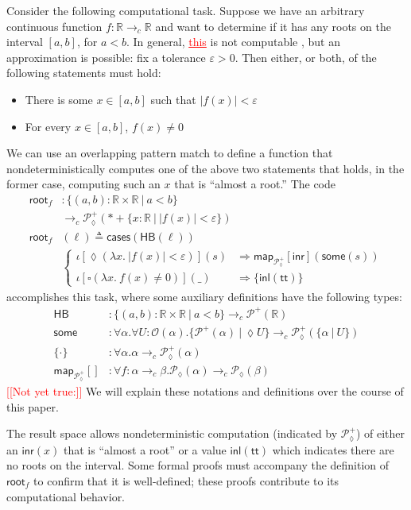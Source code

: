 \documentclass[conference]{IEEEtran}
\newcommand{\PLower}{\mathcal{P}_\lozenge}
\newcommand{\Viet}{\mathcal{P}}
\newcommand{\cto}{\to_c}
\newcommand{\R}{\mathbb{R}}
\newcommand{\map}[2]{\mathsf{map}_{#1}[{#2}]}
\newcommand{\fun}[2]{\lambda {#1}.\  {#2}}
\newcommand{\suchthat}{\ |\ }
\newcommand{\One}{\ast}
\newcommand{\Open}[1]{\mathcal{O}({#1})}
\newcommand{\wildcard}{\_}
\newcommand{\oinclf}[1]{\iota[{#1}]}
\newcommand{\oincl}[2]{\oinclf{#1} \left({#2}\right)}
\newcommand{\Branch}{\Rightarrow}
\newcommand{\note}[1]{\textcolor{red}{[[{#1}]]}}
\newcommand{\grammar}[1]{\textcolor{red}{\underline{#1}}}
\begin{document}
Consider the following computational task. Suppose we have an arbitrary continuous function $f : \R \cto \R$ and want to determine if it has any roots on the interval $[a,b]$, for $a < b$. In general, \grammar{this} is not computable \cite{lamcra}, but an approximation is possible: fix a tolerance $\varepsilon > 0$. Then either, or both, of the following statements must hold:
\begin{itemize}
\item There is some $x \in [a, b]$ such that $|f(x)| < \varepsilon$
\item For every $x \in [a, b]$, $f(x) \neq 0$
\end{itemize}
We can use an overlapping pattern match to define a function that nondeterministically computes one of the above two statements that holds, in the former case, computing such an $x$ that is ``almost a root.'' The code
\begin{align*}
\mathsf{root}_f &: \{ (a, b) : \R \times \R \suchthat a < b \}
  \\ &\cto \PLower^+(\One + \{ x : \R \suchthat |f(x)| < \varepsilon \})
\\ \mathsf{root}_f&(\ell) \triangleq \mathsf{cases}(\mathsf{HB}(\ell))
\\ &\begin{cases}
\oincl{\lozenge (\fun{x}{|f(x)| < \varepsilon})}{s} 
  &\Branch \map{\PLower^+}{\mathsf{inr}}(\mathsf{some}(s))
\\ \oincl{\square (\fun{x}{f(x) \neq 0})}{\wildcard}
  &\Branch \{ \mathsf{inl}(\mathsf{tt}) \}
\end{cases}
\end{align*}
accomplishes this task, where some auxiliary definitions have the following types:
\begin{align*}
\mathsf{HB} &: \{ (a, b) : \R \times \R \suchthat a < b \} \cto \Viet^+(\R)
\\ \mathsf{some} &: \forall \alpha. \forall U : \Open{\alpha}. \{ \Viet^+(\alpha) \suchthat \lozenge U \} \cto \PLower^+(\{ \alpha \suchthat U \})
\\ \{ \cdot \} &: \forall \alpha. \alpha \cto \PLower^+(\alpha)
\\ \map{\PLower^+}{} &: \forall f : \alpha \cto \beta. \PLower(\alpha) \cto \PLower(\beta)
\end{align*}
\note{Not yet true:} We will explain these notations and definitions over the course of this paper.

The result space allows nondeterministic computation (indicated by $\PLower^+$) of either an $\mathsf{inr}(x)$ that is ``almost a root'' or a value $\mathsf{inl}(\mathsf{tt})$ which indicates there are no roots on the interval. Some formal proofs must accompany the definition of $\mathsf{root}_f$ to confirm that it is well-defined; these proofs contribute to its computational behavior.
 
\end{document}
